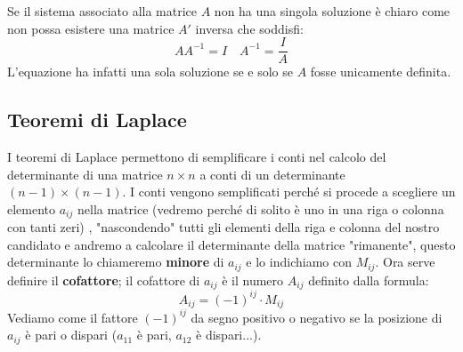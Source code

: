 \documentclass[x11names]{article}
\begin{document}
\noindent
Se il sistema associato alla matrice $A$ non ha una singola soluzione è chiaro come non possa esistere una matrice $A'$ inversa che soddisfi:
$$
AA^{-1}= I \quad A^{-1} = \frac{I}{A}
$$
L'equazione ha infatti una sola soluzione se e solo se $A$ fosse unicamente definita.


\subsection{Teoremi di Laplace}
I teoremi di Laplace permettono di semplificare i conti nel calcolo del determinante di una matrice $n \times n$  a conti di un determinante $(n-1) \times (n-1)$. I conti vengono semplificati perché si procede a scegliere un elemento $a_{ij}$ nella matrice (vedremo perché di solito è uno in una riga o colonna con tanti zeri) , "nascondendo" tutti gli elementi della riga e colonna del nostro candidato e andremo a calcolare il determinante della matrice "rimanente", questo determinante lo chiameremo \textbf{minore} di $a_{ij}$  e lo indichiamo con $M_{ij}$.
Ora serve definire il \textbf{cofattore}; il cofattore di $a_{ij}$ è il numero $A_{ij}$ definito dalla formula:
$$
A_{ij}  = (-1)^{ij}\cdot M_{ij}
$$
Vediamo come il fattore $(-1)^{ij}$ da segno positivo o negativo se la posizione di $a_{ij}$ è pari o dispari ($a_{11}$ è pari, $a_{12}$ è dispari...). 
\end{document}
